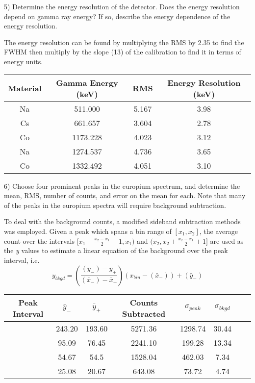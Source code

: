 \documentclass[10pt]{article}
\begin{document}
\begin{flushleft}
5) Determine the energy resolution of the detector. Does the energy resolution depend on gamma ray energy? If so, describe the energy dependence of the energy resolution.
\end{flushleft}
The energy resolution can be found by multiplying the RMS by 2.35 to find the FWHM then multiply by the slope (13) of the calibration to find it in terms of energy units.\cite{wikipedia}
\begin{center}
\begin{tabular}{|c|c|c|c|}
\hline
Material & Gamma Energy (keV) & RMS & Energy Resolution (keV)\\ 
\hline 
Na & 511.000 & 5.167 & 3.98 \\ 
\hline
Cs & 661.657 & 3.604 & 2.78 \\
\hline
Co & 1173.228 & 4.023 & 3.12 \\
\hline
Na & 1274.537 & 4.736 & 3.65 \\
\hline
Co & 1332.492 & 4.051 & 3.10 \\
\hline
\end{tabular}
\end{center}
\begin{flushleft}
6) Choose four prominent peaks in the europium spectrum, and determine the mean, RMS, number of counts, and error on the mean for each. Note that many of the peaks in the europium spectra will require background subtraction.
\end{flushleft}
To deal with the background counts, a modified sideband subtraction methods was employed. Given a peak which spans a bin range of $[x_1,x_2]$, the average count over the intervals $[x_1-\frac{x_2-x_1}{2}-1,x_1)$ and $(x_2,x_2+\frac{x_2-x_1}{2}+1]$ are used as the \textit{y} values to estimate a linear equation of the background over the peak interval, i.e.
\begin{equation}
y_{bkgd} = \left(\frac{(\bar y_{-})-\bar y_{+}}{(\bar x_{-})-\bar x_{+}}\right)(x_{bin}-(\bar x_{-}))+(\bar y_{-})
\end{equation}
\begin{center}
\begin{tabular}{|c|c|c|c|c|c|c|c|}
\hline 
Peak Interval & $\bar y_{-}$ & $\bar y_{+}$  & Counts Subtracted &  $\sigma_{peak}$ & $\sigma_{bkgd}$ \\ 
\hline 
[312,335] & 243.20 & 193.60 & 5271.36 & 1298.74 & 30.44 \\ 
\hline 
[686,711] & 95.09 & 76.45 & 2241.10 & 199.28 & 13.34 \\ 
\hline
[990,1017] & 54.67 & 54.5 & 1528.04 & 462.03 & 7.34 \\
\hline 
[2320,2347] & 25.08 & 20.67 & 643.08 & 73.72 & 4.74 \\ 
\hline 
\end{tabular}
\end{center}
\end{document}
